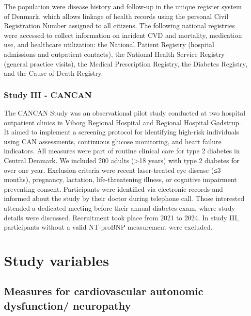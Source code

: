 \documentclass[
  a4paper,
  headsepline=true,
  open=any]{scrbook}
\begin{document}
The population were disease history and follow-up in the unique register
system of Denmark, which allows linkage of health records using the
personal Civil Registration Number assigned to all citizens. The
following national registries were accessed to collect information on
incident CVD and mortality, medication use, and healthcare utilization:
the National Patient Registry (hospital admissions and outpatient
contacts), the National Health Service Registry (general practice
visits), the Medical Prescription Registry, the Diabetes Registry, and
the Cause of Death Registry.

\hypertarget{study-iii---cancan}{%
\subsubsection{Study III - CANCAN}\label{study-iii---cancan}}

The CANCAN Study was an observational pilot study conducted at two
hospital outpatient clinics in Viborg Regional Hospital and Regional
Hospital Gødstrup. It aimed to implement a screening protocol for
identifying high-risk individuals using CAN assessments, continuous
glucose monitoring, and heart failure indicators. All measures were part
of routine clinical care for type 2 diabetes in Central Denmark. We
included 200 adults (\textgreater18 years) with type 2 diabetes for over
one year. Exclusion criteria were recent laser-treated eye disease (≤3
months), pregnancy, lactation, life-threatening illness, or cognitive
impairment preventing consent. Participants were identified via
electronic records and informed about the study by their doctor during
telephone call. Those interested attended a dedicated meeting before
their annual diabetes exam, where study details were discussed.
Recruitment took place from 2021 to 2024. In study III, participants
without a valid NT-proBNP measurement were excluded.

\hypertarget{study-variables}{%
\section{Study variables}\label{study-variables}}

\hypertarget{measures-for-cardiovascular-autonomic-dysfunction-neuropathy}{%
\subsection{Measures for cardiovascular autonomic dysfunction/
neuropathy}\label{measures-for-cardiovascular-autonomic-dysfunction-neuropathy}}
\end{document}
